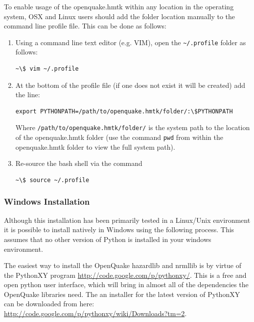 To enable usage of the openquake.hmtk within any location in the operating system, OSX and Linux users should add the folder location manually to the command line profile file. This can be done as follows:

\begin{enumerate}
\item Using a command line text editor (e.g. VIM), open the \verb=~/.profile= folder as follows:

\begin{Verbatim}[frame=single, commandchars=\\\{\}, fontsize=\scriptsize]
~\$ vim ~/.profile
\end{Verbatim}

\item At the bottom of the profile file (if one does not exist it will be created) add the line:

\begin{Verbatim}[frame=single, commandchars=\\\{\}, fontsize=\scriptsize]
export PYTHONPATH=/path/to/openquake.hmtk/folder/:\$PYTHONPATH
\end{Verbatim}

Where \verb=/path/to/openquake.hmtk/folder/= is the system path to the location of the openquake.hmtk folder (use the command \verb=pwd= from within the openquake.hmtk folder to view the full system path).

\item Re-source the bash shell via the command

\begin{Verbatim}[frame=single, commandchars=\\\{\}, fontsize=\scriptsize]
~\$ source ~/.profile
\end{Verbatim}
 
\end{enumerate}

\subsubsection{Windows Installation}

Although this installation has been primarily tested in a Linux/Unix environment it is possible to install natively in Windows using the following process. This assumes that no other version of Python is installed in your windows environment.

The easiest way to install the OpenQuake hazardlib and nrmllib is by virtue of the PythonXY program \href{http://code.google.com/p/pythonxy/}{http://code.google.com/p/pythonxy/}. This is a free and open python user interface, which will bring in almost all of the dependencies the OpenQuake libraries need. The an installer for the latest version of PythonXY can be downloaded from here: \\ \href{http://code.google.com/p/pythonxy/wiki/Downloads?tm=2}{http://code.google.com/p/pythonxy/wiki/Downloads?tm=2}.

